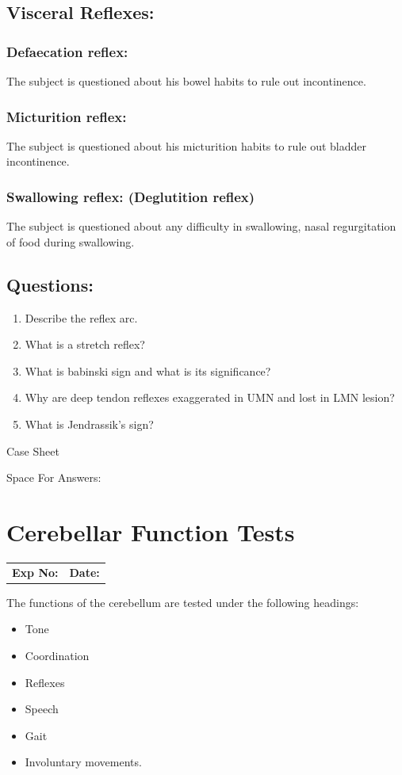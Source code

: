 \documentclass[a4paper,12pt,openany,twoside]{book}
\newcommand{\blankpageForCaseSheet}{
	\newpage
	\thispagestyle{plain}
	\begin{center}
		\huge Case Sheet 
	\end{center}
	\newpage
	\thispagestyle{plain}
	\mbox{}
	}
\newcommand{\blankpageForAnswers}{
	\newpage
	\thispagestyle{plain}
	\begin{center}
		\Large Space For Answers: 
	\end{center}
	}
\begin{document}
\section*{Visceral Reflexes:}
\subsection*{Defaecation reflex:}
The subject is questioned about his bowel habits to rule out incontinence.
\subsection*{Micturition reflex:}
The subject is questioned about his micturition habits to rule out bladder incontinence.
\subsection*{Swallowing reflex: (Deglutition reflex)}
The subject is questioned about any difficulty in swallowing, nasal regurgitation of food during swallowing.
\section*{Questions:}
\begin{enumerate}
		\itemsep0em
\item{Describe the reflex arc.}
\item{What is a stretch reflex?}
\item{What is babinski sign and what is its significance?}
\item{Why are deep tendon reflexes exaggerated in UMN and lost in LMN lesion?}
\item{What is Jendrassik's sign?}
\end{enumerate}
\blankpageForCaseSheet
\blankpageForAnswers
\chapter*{\centering Cerebellar Function Tests}
															\begin{tabular}{p{5in} p{1in}}
																\textbf{Exp No:}  & \textbf{Date:}\\
															\end{tabular}
The functions of the cerebellum are tested under the following headings:
\begin{itemize}
\item{Tone}
\item{Coordination}
\item{Reflexes}
\item{Speech}
\item{Gait}
\item{Involuntary movements.}
\end{itemize}
\end{document}
